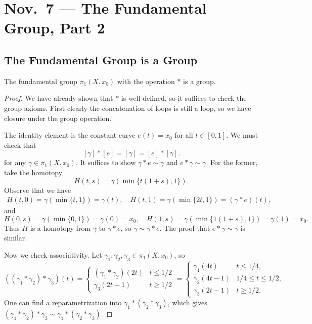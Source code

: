 \chapter{Nov.~7 --- The Fundamental Group, Part 2}

\section{The Fundamental Group is a Group}
\begin{theorem}
  The fundamental group $\pi_1(X, x_0)$ with the
  operation $*$ is a group.
\end{theorem}

\begin{proof}
  We have already shown that $*$ is well-defined,
  so it suffices to check the group axioms. First
  clearly the concatenation of loops is still a
  loop, so we have closure under the group operation.

  The identity element is the constant
  curve $e(t) = x_0$ for all $t \in [0, 1]$. We
  must check that
  \[
    [\gamma] * [e] = [\gamma] = [e] * [\gamma].
  \]
  for any $\gamma \in \pi_1(X, x_0)$. It suffices
  to show $\gamma * e \sim \gamma$ and $e * \gamma \sim \gamma$.
  For the former, take the homotopy
  \[
    H(t, s) = \gamma(\min\{t(1 + s), 1\}).
  \]
  Observe that we have
  \begin{align*}
    H(t, 0) = \gamma(\min\{t, 1\}) = \gamma(t), \quad
    H(t, 1) = \gamma(\min\{2t, 1\}) = (\gamma * e)(t),
  \end{align*}
  and
  \[
    H(0, s) = \gamma(\min\{0, 1\}) = \gamma(0) = x_0, \quad
    H(1, s) = \gamma(\min\{1(1 + s), 1\}) = \gamma(1) = x_0
  .\]
  Thus $H$ is a homotopy from $\gamma$ to $\gamma * e$,
  so $\gamma \sim \gamma * e$. The proof that $e * \gamma \sim \gamma$
  is similar.

  Now we check associativity. Let
  $\gamma_1, \gamma_2, \gamma_3 \in \pi_1(X, x_0)$, so
  \[
    ((\gamma_1 * \gamma_2) * \gamma_3)(t) =
    \begin{cases}
      (\gamma_1 * \gamma_2)(2t) & t \le 1/2 \\
      \gamma_3(2t - 1) & t \ge 1 / 2
    \end{cases} =
    \begin{cases}
      \gamma_1(4t) & t \le 1/4, \\
      \gamma_2(4t - 1) & 1/4 \le t \le 1/2, \\
      \gamma_3(2t - 1) & t \ge 1/2.
    \end{cases}
  \]
  One can find a reparametrization
  into $\gamma_1 * (\gamma_2 * \gamma_3)$,
  which gives $(\gamma_1 * \gamma_2) * \gamma_3 \sim \gamma_1 * (\gamma_2 * \gamma_3)$.


\end{proof}
